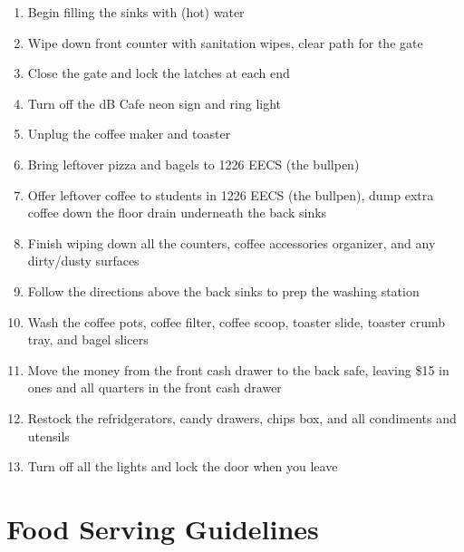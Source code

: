 \documentclass[12pt,onecolumn,letterpaper]{article}
\begin{document}
\begin{enumerate}
\item Begin filling the sinks with (hot) water 
\item Wipe down front counter with sanitation wipes, clear path for the gate
\item Close the gate and lock the latches at each end
\item Turn off the dB Cafe neon sign and ring light
\item Unplug the coffee maker and toaster
\item Bring leftover pizza and bagels to 1226 EECS (the bullpen)
\item Offer leftover coffee to students in 1226 EECS (the bullpen), dump extra coffee down the floor drain underneath the back sinks
\item Finish wiping down all the counters, coffee accessories organizer, and any dirty/dusty surfaces
\item Follow the directions above the back sinks to prep the washing station
\item Wash the coffee pots, coffee filter, coffee scoop, toaster slide, toaster crumb tray, and bagel slicers
\item Move the money from the front cash drawer to the back safe, leaving \$15 in ones and all quarters in the front cash drawer
\item Restock the refridgerators, candy drawers, chips box, and all condiments and utensils
\item Turn off all the lights and lock the door when you leave
\end{enumerate}
\section{Food Serving Guidelines}
\end{document}
